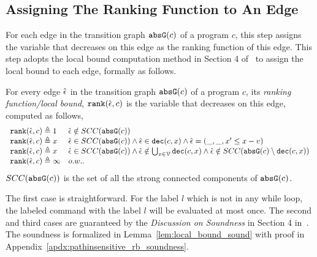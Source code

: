   \subsection{Assigning The Ranking Function to An Edge}
  For each edge in the transition graph $\mathtt{abs}{\mathtt{G}}(c)$ of a program $c$,
  this step assigns the variable that decreases on this edge as the ranking function of this edge.
  This step adopts the local bound computation method in Section 4 of~\cite{SinnZV17} to assign the local bound to each edge,
  formally as follows.
  \begin{defn}
  \label{def:ranking_gen}
  For every edge $\hat{\mathtt{\epsilon}{}}$ in the transition graph $\mathtt{abs}{\mathtt{G}}(c)$ of a program $c$,
  its \emph{ranking function/local bound}, $\mathtt{rank}(\hat{\mathtt{\epsilon}{}}, c)$
  is the variable that decreases on this edge, computed as follows,
  \[ 
  \begin{array}{ll}
    \mathtt{rank}(\hat{\mathtt{\epsilon}{}}, c) \triangleq 1 
    & \hat{\mathtt{\epsilon}{}} \notin SCC(\mathtt{abs}{\mathtt{G}}(c))
    \\
    \mathtt{rank}(\hat{\mathtt{\epsilon}{}}, c) \triangleq x
    & \hat{\mathtt{\epsilon}{}} \in SCC(\mathtt{abs}{\mathtt{G}}(c)) \land \hat{\mathtt{\epsilon}{}} \in \mathtt{dec}(c, x) \land  \hat{\mathtt{\epsilon}{}} = (\_, \_ , x' \leq x - v) \\
    \mathtt{rank}(\hat{\mathtt{\epsilon}{}}, c) \triangleq x
    & \hat{\mathtt{\epsilon}{}} \in SCC(\mathtt{abs}{\mathtt{G}}(c)) \land 
    \hat{\mathtt{\epsilon}{}}  \notin \bigcup_{x \in \mathcal{V}} \mathtt{dec}(c, x)
    \land \hat{\mathtt{\epsilon}{}} \notin SCC(\mathtt{abs}{\mathtt{G}}(c) \setminus \mathtt{dec}(c, x))\\
    \mathtt{rank}(\hat{\mathtt{\epsilon}{}}, c) \triangleq \infty
    & o.w..
  \end{array}
  \]
  $SCC(\mathtt{abs}{\mathtt{G}}(c))$ is the set of all the strong connected components of $\mathtt{abs}{\mathtt{G}}(c)$.
  \end{defn}
    The first case is straightforward. 
    For the label $l$ which is not in any while loop, 
    the labeled command with the label $l$ will be 
    evaluated at most once. 
    The second and third cases are guaranteed by the \emph{Discussion on Soundness} in Section 4 in~\cite{SinnZV17}.
    The soundness is formalized in Lemma~\ref{lem:local_bound_sound} with proof in Appendix~\ref{apdx:pathinsensitive_rb_soundness}.
